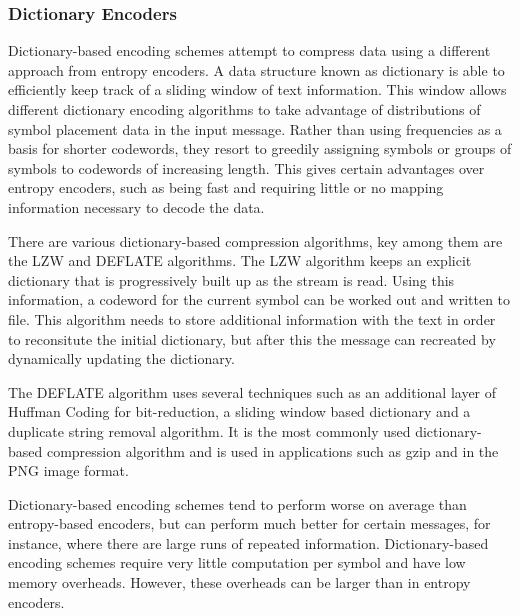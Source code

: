 \documentclass[a4paper,11pt]{report}
\begin{document}
\subsubsection*{Dictionary Encoders}

Dictionary-based encoding schemes attempt to compress data using a different approach from entropy encoders\cite{RefWorks:2}. A data structure known as dictionary is able to efficiently keep track of a sliding window of text information. This window allows different dictionary encoding algorithms to take advantage of distributions of symbol placement data in the input message. Rather than using frequencies as a basis for shorter codewords, they resort to greedily assigning symbols or groups of symbols to codewords of increasing length. This gives certain advantages over entropy encoders, such as being fast and requiring little or no mapping information necessary to decode the data. 

There are various dictionary-based compression algorithms, key among them are the LZW and DEFLATE algorithms. The LZW algorithm keeps an explicit dictionary that is progressively built up as the stream is read.\cite{1320134} Using this information, a codeword for the current symbol can be worked out and written to file. This algorithm needs to store additional information with the text in order to reconsitute the initial dictionary, but after this the message can recreated by dynamically updating the dictionary. 

The DEFLATE algorithm uses several techniques such as an additional layer of Huffman Coding for bit-reduction, a sliding window based dictionary and a duplicate string removal algorithm\cite{deflaterfc}. It is the most commonly used dictionary-based compression algorithm and is used in applications such as gzip and in the PNG image format. 

Dictionary-based encoding schemes tend to perform worse on average than entropy-based encoders, but can perform much better for certain messages, for instance, where there are large runs of repeated information. Dictionary-based encoding schemes require very little computation per symbol and have low memory overheads. However, these overheads can be larger than in entropy encoders. 
\end{document}
